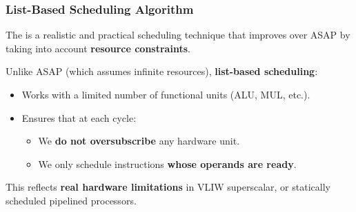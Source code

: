 \subsubsection{List-Based Scheduling Algorithm}\label{subsubsection: List-Based Scheduling Algorithm}

The  is a realistic and practical scheduling technique that improves over ASAP by taking into account \textbf{resource constraints}.

\highspace
Unlike ASAP (which assumes infinite resources), \textbf{list-based scheduling}:
\begin{itemize}
    \item Works with a limited number of functional units (ALU, MUL, etc.).
    \item Ensures that at each cycle:
    \begin{itemize}[label=\textcolor{Green3}{}]
        \item We \textbf{do not oversubscribe} any hardware unit.
        \item We only schedule instructions \textbf{whose operands are ready}.
    \end{itemize}
\end{itemize}
This reflects \textbf{real hardware limitations} in VLIW superscalar, or statically scheduled pipelined processors.

